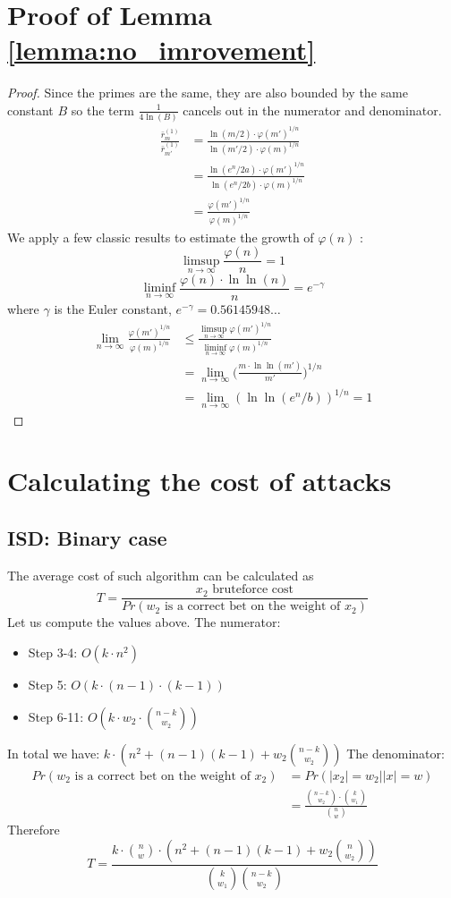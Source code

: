 \documentclass[12pt]{article}
\begin{document}
\section{Proof of Lemma \ref{lemma:no_imrovement}}
\label{app:B}
\begin{proof}
Since the primes are the same, they are also bounded by the same constant $B$ so the term $\frac{1}{4 \ln(B)}$ cancels out in the numerator and denominator.
\[
\begin{split}
\frac{\bar r_{m}^{(1)}}{\bar r_{m'}^{(1)}}
& = \frac{\ln(m/2) \cdot \varphi(m')^{1/n}}{\ln(m'/2) \cdot \varphi(m)^{1/n}} \\
& = \frac{\ln(e^n/2a) \cdot \varphi(m')^{1/n}}{\ln(e^n/2b) \cdot \varphi(m)^{1/n}} \\
& = \frac{\varphi(m')^{1/n}}{\varphi(m)^{1/n}}
\end{split}
\]
We apply a few classic results to estimate the growth of $\varphi(n)$ \cite{[HW09]}:
\[
    \limsup\limits_{n \rightarrow \infty} \frac{\varphi(n)}{n} = 1
\]
\[
    \liminf\limits_{n \rightarrow \infty} \frac{\varphi(n) \cdot \ln\ln(n)}{n} = e^{-\gamma}
\]
where $\gamma$ is the Euler constant, $e^{-\gamma} = 0.56145948\dots$
\[
\begin{split}
\lim_{n \rightarrow \infty} \frac{\varphi(m')^{1/n}}{\varphi(m)^{1/n}}
& \leq \frac{\limsup\limits_{n \rightarrow \infty} \varphi(m')^{1/n}}{\liminf\limits_{n \rightarrow\infty}\varphi(m)^{1/n}} \\
& = \lim_{n \rightarrow \infty} \bigg(\frac{m \cdot \ln\ln (m')}{m'}\bigg)^{1/n} \\
& = \lim_{n \rightarrow \infty} (\ln\ln(e^n/b))^{1/n} = 1
\end{split}
\]
\end{proof}
\section{Calculating the cost of attacks}
\label{app:A}

\subsection{ISD: Binary case}
The average cost of such algorithm can be calculated as
\[
T = \frac{x_2\text{ bruteforce cost}}{Pr(w_2\text{ is a correct bet on the weight of }x_2)}
\]
Let us compute the values above.
The numerator:
\begin{itemize}
    \item Step 3-4: $O(k\cdot n^2)$
    \item Step 5: $O(k \cdot (n-1) \cdot (k-1))$
    \item Step 6-11: $O(k \cdot w_2 \cdot \binom{n-k}{w_2})$
\end{itemize}
In total we have: $k \cdot (n^2 + (n-1)(k-1) + w_2\binom{n-k}{w_2})$
The denominator:
\[
\begin{split}
    Pr(w_2\text{ is a correct bet on the weight of }x_2) & = Pr(|x_2| = w_2||x| = w) \\
    & = \frac{\binom{n-k}{w_2} \cdot \binom{k}{w_1}}{\binom{n}{w}}
\end{split}
\]
Therefore
\[
T = \frac{k\cdot\binom{n}{w}\cdot(n^2 + (n-1)(k-1) + w_2\binom{n}{w_2})}{\binom{k}{w_1}\binom{n-k}{w_2}}
\]
\end{document}
